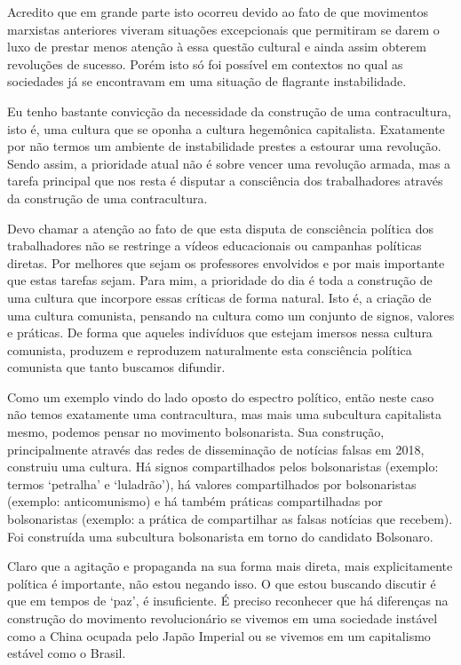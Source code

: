 Acredito que em grande parte isto ocorreu devido ao fato de que movimentos marxistas anteriores viveram situações excepcionais que permitiram se darem o luxo de prestar menos atenção à essa questão cultural e ainda assim obterem revoluções de sucesso. Porém isto só foi possível em contextos no qual as sociedades já se encontravam em uma situação de flagrante instabilidade.

Eu tenho bastante convicção da necessidade da construção de uma contracultura, isto é, uma cultura que se oponha a cultura hegemônica capitalista. Exatamente por não termos um ambiente de instabilidade prestes a estourar uma revolução. Sendo assim, a prioridade atual não é sobre vencer uma revolução armada, mas a tarefa principal que nos resta é disputar a consciência dos trabalhadores através da construção de uma contracultura.

Devo chamar a atenção ao fato de que esta disputa de consciência política dos trabalhadores não se restringe a vídeos educacionais ou campanhas políticas diretas. Por melhores que sejam os professores envolvidos e por mais importante que estas tarefas sejam. Para mim, a prioridade do dia é toda a construção de uma cultura que incorpore essas críticas de forma natural. Isto é, a criação de uma cultura comunista, pensando na cultura como um conjunto de signos, valores e práticas. De forma que aqueles indivíduos que estejam imersos nessa cultura comunista, produzem e reproduzem naturalmente esta consciência política comunista que tanto buscamos difundir.

Como um exemplo vindo do lado oposto do espectro político, então neste caso não temos exatamente uma contracultura, mas mais uma subcultura capitalista mesmo, podemos pensar no movimento bolsonarista. Sua construção, principalmente através das redes de disseminação de notícias falsas em 2018, construiu uma cultura. Há signos compartilhados pelos bolsonaristas (exemplo: termos ‘petralha’ e ‘luladrão’), há valores compartilhados por bolsonaristas (exemplo: anticomunismo) e há também práticas compartilhadas por bolsonaristas (exemplo: a prática de compartilhar as falsas notícias que recebem). Foi construída uma subcultura bolsonarista em torno do candidato Bolsonaro.

Claro que a agitação e propaganda na sua forma mais direta, mais explicitamente política é importante, não estou negando isso. O que estou buscando discutir é que em tempos de ‘paz’, é insuficiente. É preciso reconhecer que há diferenças na construção do movimento revolucionário se vivemos em uma sociedade instável como a China ocupada pelo Japão Imperial ou se vivemos em um capitalismo estável como o Brasil. 

